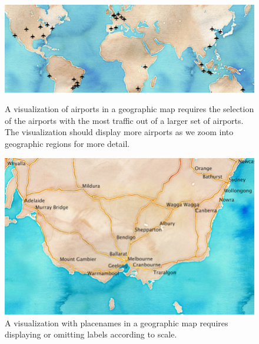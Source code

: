 \documentclass[11pt, oneside]{report}
\begin{document}
\begin{figure}[!t]
     \begin{minipage}{0.62\linewidth}
        \centerline{\includegraphics[width=0.99\linewidth]{figs-glossy/airports.png}}
        \vspace{-1ex}
        \caption{A visualization of airports in a geographic map requires the selection of the airports with the most traffic out of a larger set of airports. The visualization should display more airports as we zoom into geographic regions for more detail.}\label{fig:example:airports}
    \end{minipage} \hfill
       \begin{minipage}{0.36\linewidth}
        \centerline{\includegraphics[width=0.96\linewidth]{figs-glossy/placenames_viz.png}}
        \vspace{-1ex}
        \caption{A visualization with placenames in a geographic map requires displaying or omitting labels according to scale.} \label{fig:example:placenames}
    \end{minipage} \hfill
\end{figure}
 
\end{document}
